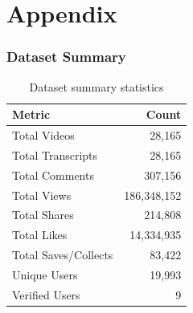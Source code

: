 \documentclass[12pt,a4paper]{report}
\begin{document}
\clearpage
{} %
\chapter{Appendix}

\subsection*{Dataset Summary}
\begin{table}[htbp]
    \centering
    \begin{tabular}{lr}
        \toprule
        \textbf{Metric} & \textbf{Count} \\
        \midrule
        Total Videos & 28,165 \\
        Total Transcripts & 28,165 \\
        Total Comments & 307,156 \\
        Total Views & 186,348,152 \\
        Total Shares & 214,808 \\
        Total Likes & 14,334,935 \\
        Total Saves/Collects & 83,422 \\
        Unique Users & 19,993 \\
        Verified Users & 9 \\
        \bottomrule
    \end{tabular}
    \caption{Dataset summary statistics}
    \label{tab:dataset_summary}
\end{table}
\clearpage
{}
{}
\end{document}
